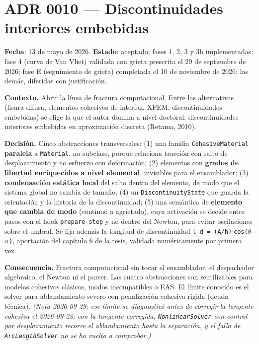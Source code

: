 \documentclass[11pt,oneside]{report}
\begin{document}
\section{ADR 0010 --- Discontinuidades interiores embebidas}
\label{adr:0010}

\textbf{Fecha}: 13 de mayo de 2026. \textbf{Estado}: aceptado; fases 1, 2, 3 y 3b implementadas; fase 4 (curva de Van Vliet) validada con grieta prescrita el 29 de septiembre de 2026; fase E (seguimiento de grieta) completada el 10 de noviembre de 2026; las demás, diferidas con justificación.

\textbf{Contexto.} Abrir la línea de fractura computacional. Entre las alternativas (fisura difusa, elementos cohesivos de interfaz, XFEM, discontinuidades embebidas) se elige la que el autor domina a nivel doctoral: discontinuidades interiores embebidas en aproximación discreta (Retama, 2010).

\textbf{Decisión.} Cinco abstracciones transversales: (1) una familia \texttt{CohesiveMaterial} \textbf{paralela} a \texttt{Material}, no subclase, porque relaciona tracción con salto de desplazamiento y no esfuerzo con deformación; (2) elementos con \textbf{grados de libertad enriquecidos a nivel elemental}, invisibles para el ensamblador; (3) \textbf{condensación estática local} del salto dentro del elemento, de modo que el sistema global no cambia de tamaño; (4) un \texttt{DiscontinuityState} que guarda la orientación y la historia de la discontinuidad; (5) una semántica de \textbf{elemento que cambia de modo} (continuo a agrietado), cuya activación se decide entre pasos con el hook \texttt{prepare\_step} y no dentro del Newton, para evitar oscilaciones sobre el umbral. Se fija además la longitud de discontinuidad \texttt{l\_\allowbreak{}d = (A/\allowbreak{}h)\ensuremath{\cdot}cos(\ensuremath{\theta}−\ensuremath{\alpha})}, aportación del \hyperref[cap:6]{capítulo 6} de la tesis, validada numéricamente por primera vez.

\textbf{Consecuencia.} Fractura computacional sin tocar el ensamblador, el despachador algebraico, el Newton ni el parser. Las cuatro abstracciones son reutilizables para modelos cohesivos clásicos, modos incompatibles o EAS. El límite conocido es el solver para ablandamiento severo con penalización cohesiva rígida (deuda técnica). \textit{(Nota 2026-09-29: ese límite se diagnosticó antes de corregir la tangente cohesiva el 2026-09-23; con la tangente corregida, \texttt{NonlinearSolver} con control por desplazamiento recorre el ablandamiento hasta la separación, y el fallo de \texttt{ArcLengthSolver} no se ha vuelto a comprobar.)}
\end{document}
